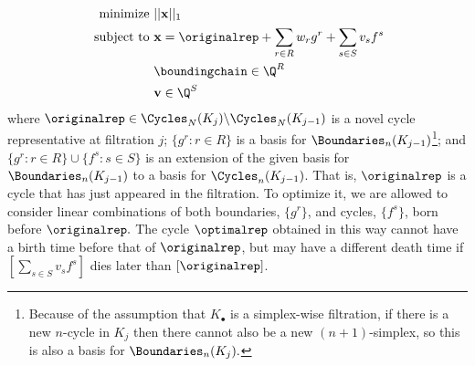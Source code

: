 \begin{align}
\begin{split}
\text{minimize } & ||\mathbf{x} ||_1  \\
\text{ subject to } & \mathbf{x} = \originalrep + \sum_{r\in R} w_r g^r + \sum_{s \in S} v_s f^s \\
& \boundingchain \in \Q^R  \\
& \mathbf{v} \in \Q^S
\end{split}
\label{eq:escolarargmin}
\end{align}
where $\originalrep \in\Cycles_N(K_j) \backslash \Cycles_N(K_{j-1})$ is a novel cycle representative at filtration $j$; $\{g^r : r \in R\}$ is a basis for $\Boundaries_n(K_{j-1})$\footnote{Because of the assumption that $K_\bullet$ is a simplex-wise filtration, if there is a new $n$-cycle in $K_j$ then there cannot also be a new $(n+1)$-simplex, so this is also a basis for $\Boundaries_n(K_j).$}; and $\{g^r : r \in R\} \cup \{f^s : s \in S\}$ is an extension of the given basis for $\Boundaries_n(K_{j-1})$ to a basis for $\Cycles_n(K_{j-1})$. That is, $\originalrep$ is a cycle that has just appeared in the filtration. To optimize it, we are allowed to consider linear combinations of both boundaries, $\{g^r\}$, and cycles, $\{f^s\}$, born before $\originalrep.$ The cycle $\optimalrep$ obtained in this way cannot have a birth time before that of $\originalrep$, but may have a different death time if $[\sum_{s\in S}v_sf^s]$ dies later than $[\originalrep]$. 



